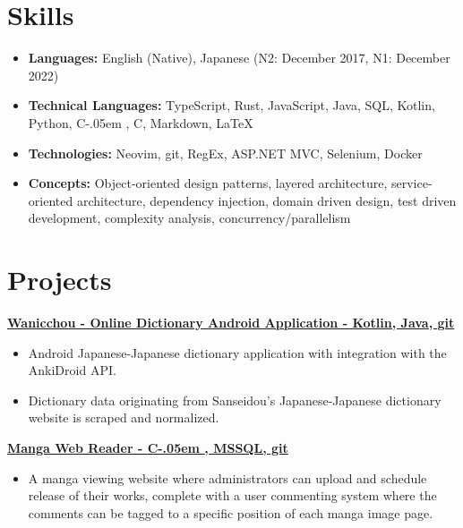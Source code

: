 \documentclass[letterpaper,11pt]{article}
\newcommand{\resumeItem}[2]{
    \vspace{-2pt}
    \item\small{
        \textbf{#1}{ #2 \vspace{-2pt}}
    }
}
\newcommand{\resumeSubItem}[2]{\resumeItem{#1}{#2}}
\newcommand{\resumeItemListStart}{\begin{itemize}}
\newcommand{\resumeItemListEnd}{\end{itemize}}
\def\Cplusplus{C\raisebox{0.5ex}{\tiny\textbf{++}}}
\newcommand{\Csharp}{%
  {\settoheight{\dimen0}{C}C\kern-.05em \resizebox{!}{\dimen0}{\raisebox{\depth}{\#}}}}
\begin{document}
\section{\textbf{Skills}}
\begin{itemize}
    \resumeSubItem{\textbf{Languages:}}
        {
            English (Native),
            Japanese (N2: December 2017, N1: December 2022)
        }
    \resumeSubItem{\textbf{Technical Languages:}}
        {
            TypeScript,
            Rust,
            JavaScript,
            Java,
            SQL,
            Kotlin,
            Python,
            \Csharp,
            \Cplusplus,
            Markdown,
            \LaTeX
        }
    \resumeSubItem{\textbf{Technologies:}}
        {
            Neovim,
            git,
            RegEx,
            ASP.NET MVC,
            Selenium,
            Docker
        }
    \resumeSubItem{\textbf{Concepts:}}
        {
            Object-oriented design patterns,
            layered architecture,
            service-oriented architecture,
            dependency injection,
            domain driven design,
            test driven development,
            complexity analysis,
            concurrency/parallelism
        }
 \end{itemize}

\section{\textbf{Projects}}
    \small{\textbf{
        \href {
            https://github.com/Limegrass/Wanicchou
        } {
            Wanicchou - Online Dictionary Android Application
            - Kotlin, Java, git
        }}}
    \resumeItemListStart
        \resumeItem{}
            {
                Android Japanese-Japanese dictionary application with integration with the AnkiDroid API.
            }
        \resumeItem{}
            {
                Dictionary data originating from Sanseidou's Japanese-Japanese
                dictionary website is scraped and normalized.
            }
    \resumeItemListEnd
    \small{\textbf{
        \href{
            https://waifusims.com/Manga/Hakoiri
        }{
            Manga Web Reader
            - \Csharp, MSSQL, git
        }}}
    \resumeItemListStart
        \resumeItem{}
            {
                A manga viewing website where administrators can upload and schedule
                release of their works, complete with a user commenting system
                where the comments can be tagged to a specific position of each manga
                image page.
            }
    \resumeItemListEnd
\end{document}
